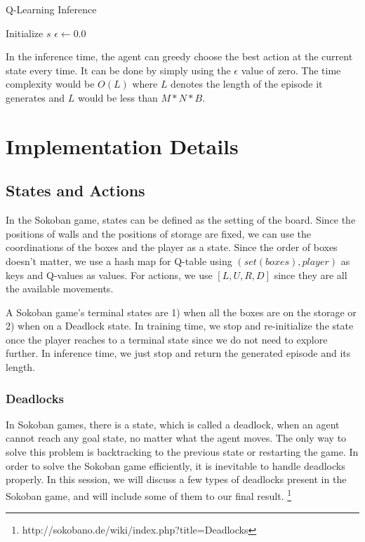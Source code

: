 \documentclass{article}
\begin{document}
\begin{algorithm}[H]
\caption{Q-Learning Inference}\label{alg:two}
Initialize $s$ 
$\epsilon \gets 0.0$ 

\end{algorithm}

In the inference time, the agent can greedy choose the best action at the current state every time. It can be done by simply using the $\epsilon$ value of zero. The time complexity would be $O(L)$ where $L$ denotes the length of the episode it generates and $L$ would be less than $M*N*B$.

\section{Implementation Details}

\subsection{States and Actions}

In the Sokoban game, states can be defined as the setting of the board. Since the positions of walls and the positions of storage are fixed, we can use the coordinations of the boxes and the player as a state. Since the order of boxes doesn't matter, we use a hash map for Q-table using $(set(boxes), player)$ as keys and Q-values as values. For actions, we use $[L, U, R, D]$ since they are all the available movements.

A Sokoban game's terminal states are 1) when all the boxes are on the storage or 2) when on a Deadlock state. In training time, we stop and re-initialize the state once the player reaches to a terminal state since we do not need to explore further. In inference time, we just stop and return the generated episode and its length.

\subsubsection{Deadlocks}

In Sokoban games, there is a state, which is called a deadlock, when an agent cannot reach any goal state, no matter what the agent moves. The only way to solve this problem is backtracking to the previous state or restarting the game. In order to solve the Sokoban game efficiently, it is inevitable to handle deadlocks properly. In this session, we will discuss a few types of deadlocks present in the Sokoban game, and will include some of them to our final result.
\footnote{http://sokobano.de/wiki/index.php?title=Deadlocks}
\end{document}
